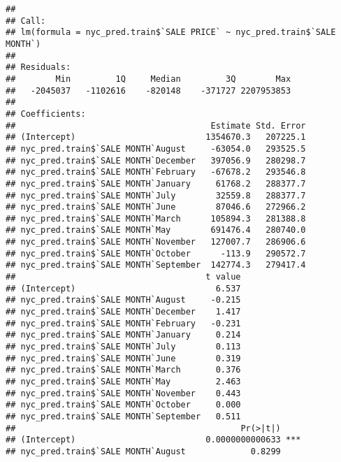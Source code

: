 \documentclass[
  a3paper,
]{article}
\newenvironment{Shaded}{\begin{snugshade}}{\end{snugshade}}
\newcommand{\CommentTok}[1]{\textcolor[rgb]{0.56,0.35,0.01}{\textit{#1}}}
\newcommand{\DataTypeTok}[1]{\textcolor[rgb]{0.13,0.29,0.53}{#1}}
\newcommand{\KeywordTok}[1]{\textcolor[rgb]{0.13,0.29,0.53}{\textbf{#1}}}
\newcommand{\NormalTok}[1]{#1}
\newcommand{\OperatorTok}[1]{\textcolor[rgb]{0.81,0.36,0.00}{\textbf{#1}}}
\newcommand{\StringTok}[1]{\textcolor[rgb]{0.31,0.60,0.02}{#1}}
\begin{document}
\begin{Shaded}
\end{Shaded}

\begin{verbatim}
## 
## Call:
## lm(formula = nyc_pred.train$`SALE PRICE` ~ nyc_pred.train$`SALE MONTH`)
## 
## Residuals:
##        Min         1Q     Median         3Q        Max 
##   -2045037   -1102616    -820148    -371727 2207953853 
## 
## Coefficients:
##                                       Estimate Std. Error
## (Intercept)                          1354670.3   207225.1
## nyc_pred.train$`SALE MONTH`August     -63054.0   293525.5
## nyc_pred.train$`SALE MONTH`December   397056.9   280298.7
## nyc_pred.train$`SALE MONTH`February   -67678.2   293546.8
## nyc_pred.train$`SALE MONTH`January     61768.2   288377.7
## nyc_pred.train$`SALE MONTH`July        32559.8   288377.7
## nyc_pred.train$`SALE MONTH`June        87046.6   272966.2
## nyc_pred.train$`SALE MONTH`March      105894.3   281388.8
## nyc_pred.train$`SALE MONTH`May        691476.4   280740.0
## nyc_pred.train$`SALE MONTH`November   127007.7   286906.6
## nyc_pred.train$`SALE MONTH`October      -113.9   290572.7
## nyc_pred.train$`SALE MONTH`September  142774.3   279417.4
##                                      t value
## (Intercept)                            6.537
## nyc_pred.train$`SALE MONTH`August     -0.215
## nyc_pred.train$`SALE MONTH`December    1.417
## nyc_pred.train$`SALE MONTH`February   -0.231
## nyc_pred.train$`SALE MONTH`January     0.214
## nyc_pred.train$`SALE MONTH`July        0.113
## nyc_pred.train$`SALE MONTH`June        0.319
## nyc_pred.train$`SALE MONTH`March       0.376
## nyc_pred.train$`SALE MONTH`May         2.463
## nyc_pred.train$`SALE MONTH`November    0.443
## nyc_pred.train$`SALE MONTH`October     0.000
## nyc_pred.train$`SALE MONTH`September   0.511
##                                             Pr(>|t|)    
## (Intercept)                          0.0000000000633 ***
## nyc_pred.train$`SALE MONTH`August             0.8299    

\end{verbatim}
\end{document}
